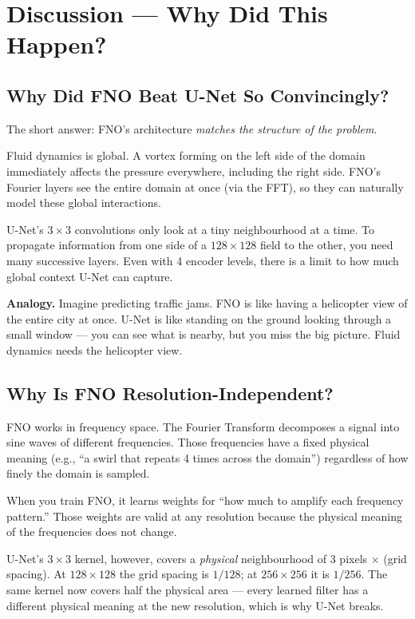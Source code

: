 \documentclass[acmsmall,nonacm]{acmart}
\begin{document}
\section{Discussion --- Why Did This Happen?}

\subsection{Why Did FNO Beat U-Net So Convincingly?}

The short answer: FNO's architecture \emph{matches the structure of the problem}.

Fluid dynamics is global.
A vortex forming on the left side of the domain immediately affects the pressure
everywhere, including the right side.
FNO's Fourier layers see the entire domain at once (via the FFT), so they can
naturally model these global interactions.

U-Net's $3 \times 3$ convolutions only look at a tiny neighbourhood at a time.
To propagate information from one side of a $128 \times 128$ field to the other,
you need many successive layers.
Even with 4 encoder levels, there is a limit to how much global context U-Net
can capture.

\begin{analogybox}
\textbf{Analogy.}
Imagine predicting traffic jams.
FNO is like having a helicopter view of the entire city at once.
U-Net is like standing on the ground looking through a small window ---
you can see what is nearby, but you miss the big picture.
Fluid dynamics needs the helicopter view.
\end{analogybox}

\subsection{Why Is FNO Resolution-Independent?}

FNO works in frequency space.
The Fourier Transform decomposes a signal into sine waves of different
frequencies.
Those frequencies have a fixed physical meaning (e.g., ``a swirl that repeats
4 times across the domain'') regardless of how finely the domain is sampled.

When you train FNO, it learns weights for ``how much to amplify each frequency
pattern.''
Those weights are valid at any resolution because the physical meaning of
the frequencies does not change.

U-Net's $3\times 3$ kernel, however, covers a \emph{physical} neighbourhood of
3 pixels $\times$ (grid spacing).
At $128 \times 128$ the grid spacing is $1/128$; at $256 \times 256$ it is
$1/256$.
The same kernel now covers half the physical area --- every learned filter has a
different physical meaning at the new resolution, which is why U-Net breaks.
\end{document}
